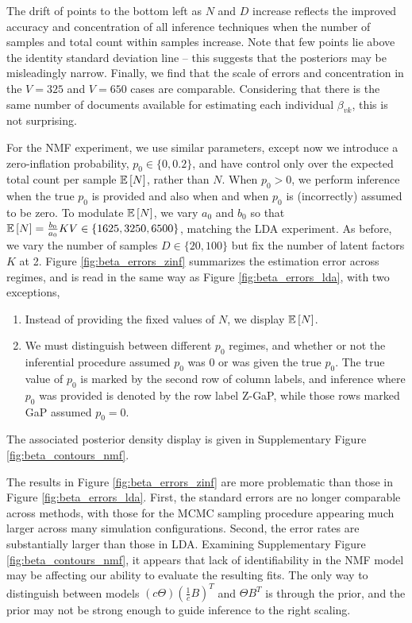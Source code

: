 \documentclass[oupdraft]{bio}
\begin{document}
The drift of points to the bottom left as $N$ and $D$ increase reflects the
improved accuracy and concentration of all inference techniques when the number
of samples and total count within samples increase. Note that few points lie
above the identity standard deviation line -- this suggests that the posteriors
may be misleadingly narrow. Finally, we find that the scale of errors and
concentration in the $V = 325$ and $V = 650$ cases are comparable. Considering
that there is the same number of documents available for estimating each
individual $\beta_{vk}$, this is not surprising.

For the NMF experiment, we use similar parameters, except now we introduce a
zero-inflation probability, $p_{0} \in \{0, 0.2\}$, and have control only over
the expected total count per sample $\mathbb{E}\left[{N}\right]$, rather than $N$. When $p_{0} >
0$, we perform inference when the true $p_0$ is provided and also when and when
$p_{0}$ is (incorrectly) assumed to be zero. To modulate $\mathbb{E}\left[{N}\right]$, we vary
$a_{0}$ and $b_{0}$ so that $\mathbb{E}\left[{N}\right] = \frac{b_{0}}{a_{0}}KV \in \{1625, 3250,
6500\}$, matching the LDA experiment. As before, we vary the number of samples
$D \in \{20, 100\}$ but fix the number of latent factors $K$ at 2. Figure
\ref{fig:beta_errors_zinf} summarizes the estimation error across regimes, and
is read in the same way as Figure \ref{fig:beta_errors_lda}, with two
exceptions,
\begin{enumerate}
\item Instead of providing the fixed values of $N$, we display $\mathbb{E}\left[{N}\right]$.
\item We must distinguish between different $p_{0}$ regimes, and whether or not
  the inferential procedure assumed $p_{0}$ was 0 or was given the true $p_{0}$.
  The true value of $p_0$ is marked by the second row of column labels, and
  inference where $p_{0}$ was provided is denoted by the row label Z-GaP, while
  those rows marked GaP assumed $p_{0} = 0$.
\end{enumerate}
The associated posterior density display is given in Supplementary Figure
\ref{fig:beta_contours_nmf}.

The results in Figure \ref{fig:beta_errors_zinf} are more problematic than those
in Figure \ref{fig:beta_errors_lda}. First, the standard errors are no longer
comparable across methods, with those for the MCMC sampling procedure appearing
much larger across many simulation configurations. Second, the error rates are
substantially larger than those in LDA. Examining Supplementary Figure
\ref{fig:beta_contours_nmf}, it appears that lack of identifiability in the NMF
model may be affecting our ability to evaluate the resulting fits. The only way
to distinguish between models $\left(c\Theta\right)\left(\frac{1}{c}
B\right)^{T}$ and $\Theta B^{T}$ is through the prior, and the prior may not be
strong enough to guide inference to the right scaling.
\end{document}
